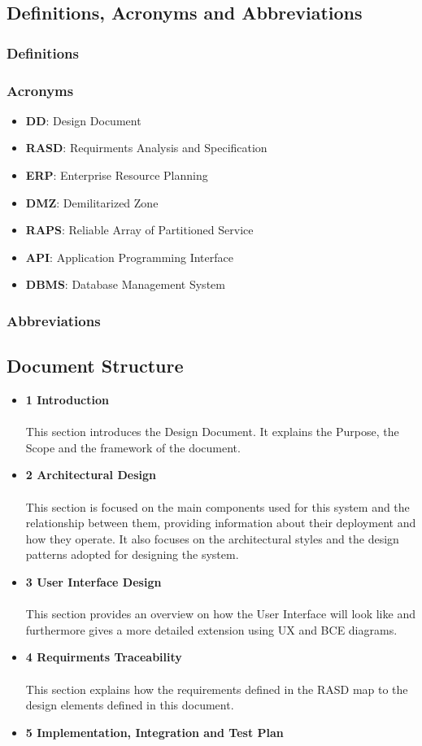 \documentclass[12pt,a4paper]{article}
\begin{document}
 	\subsection{Definitions, Acronyms and Abbreviations}
 		\subsubsection{Definitions}
 		\subsubsection{Acronyms}
 			\begin{itemize}
 				\item \textbf{DD}: Design Document
 				\item \textbf{RASD}: Requirments Analysis and Specification
 				\item \textbf{ERP}: Enterprise Resource Planning
 				\item \textbf{DMZ}: Demilitarized Zone
 				\item \textbf{RAPS}: Reliable Array of Partitioned Service
 				\item \textbf{API}: Application Programming Interface
 				\item \textbf{DBMS}: Database Management System
 			\end{itemize}
 		\subsubsection{Abbreviations}
	\subsection{Document Structure}
		\begin{itemize}
			\item \textbf{1 Introduction}\\\\
			This section introduces the Design Document. It explains the Purpose, the Scope and the framework of the document.
			\item \textbf{2 Architectural Design}\\\\
			This section is focused on the main components used for this system and the relationship between them, providing information about their deployment and how they operate. It also focuses on the architectural styles and the design patterns adopted for designing the system.
			\item \textbf{3 User Interface Design}\\\\
			This section provides an overview on how the User Interface will look like and furthermore gives a more detailed extension using UX and BCE diagrams.
			\item \textbf{4 Requirments Traceability}\\\\
			This section explains how the requirements defined in the RASD map to the design elements defined in this document.
			\item \textbf{5 Implementation, Integration and Test Plan}
		\end{itemize}
\newpage
\end{document}
